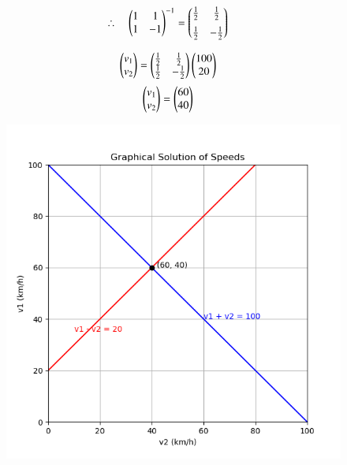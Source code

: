 \documentclass[journal]{IEEEtran}
\begin{document}
\begin{align}
\therefore \quad 
\begin{pmatrix}1 & 1 \\ 1 & -1\end{pmatrix}^{-1} &= \begin{pmatrix}\frac{1}{2} & \frac{1}{2} \\[2mm] \frac{1}{2} & -\frac{1}{2}\end{pmatrix}
\end{align}

\begin{align}
\begin{pmatrix}v_1 \\ v_2\end{pmatrix} &= \begin{pmatrix}\frac{1}{2} & \frac{1}{2} \\ \frac{1}{2} & -\frac{1}{2}\end{pmatrix} \begin{pmatrix}100 \\ 20\end{pmatrix} 
\end{align}
\begin{align}
\begin{pmatrix}v_1 \\ v_2\end{pmatrix} &= \begin{pmatrix}60 \\ 40\end{pmatrix}
\end{align}

\begin{figure}[ht!]
\centering
\includegraphics[height=0.6\textheight, keepaspectratio]{figs/speed.png}
\end{figure}
\end{document}
